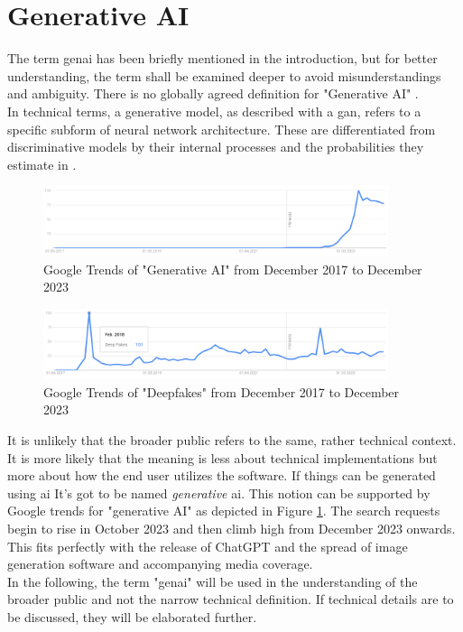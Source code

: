 \documentclass[
  a4paper,  %
  twoside,  %
  bibliography=totoc,
  headsepline,
  cleardoublepage=empty,
  parskip=half,
  draft=false
]{scrbook}
\begin{document}
\section{Generative AI}
\label{sec:genai}
The term \gls{genai} has been briefly mentioned in the introduction, but for better understanding, the term shall be examined deeper to avoid misunderstandings and ambiguity. There is no globally agreed definition for "Generative AI" \cite{garcia-penalvoWhatWeMean2023}. \\
In technical terms, a generative model, as described with a \gls{gan}, refers to a specific subform of neural network architecture. These are differentiated from discriminative models by their internal processes and the probabilities they estimate \cite{garcia-penalvoWhatWeMean2023} in \cite{gmComprehensiveSurveyAnalysis2020}.

\begin{figure}[h]
  \centering
  \includegraphics[width=0.9\textwidth]{./graphics/gtrends_genAI_1712-2312.png}
  \caption{Google Trends of "Generative AI" from December 2017 to December 2023 \cite{googletrendsGoogleTrendsQuery}}
  \label{fig:gtrend-genai}
\end{figure}
\begin{figure}[h]
  \centering
  \includegraphics[width=0.9\textwidth]{./graphics/gtrends_deepfake_1712-2312.png}
  \caption{Google Trends of "Deepfakes" from December 2017 to December 2023 \cite{googletrendsGoogleTrendsQuerya}}
  \label{fig:gtrend-deepfakes}
\end{figure}

It is unlikely that the broader public refers to the same, rather technical context. It is more likely that the meaning is less about technical implementations but more about how the end user utilizes the software. If things can be generated using \gls{ai} It's got to be named \textit{generative} \gls{ai}. This notion can be supported by Google trends for "generative AI" as depicted in Figure \ref{fig:gtrend-genai}. The search requests begin to rise in October 2023 and then climb high from December 2023 onwards. This fits perfectly with the release of ChatGPT and the spread of image generation software and accompanying media coverage. \\
In the following, the term "\gls{genai}" will be used in the understanding of the broader public and not the narrow technical definition. If technical details are to be discussed, they will be elaborated further. 
\end{document}
